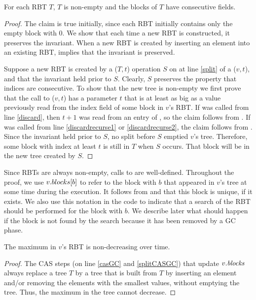 \begin{invariant}\label{nonemptyConsec}
For each RBT $T$, 
$T$ is non-empty and the blocks of $T$ have consecutive  fields.
\end{invariant}
\begin{proof}
The claim is true initially, since each RBT initially contains only the empty block with  0.
We show that each time a new RBT is constructed, it preserves the invariant.
When a new RBT is created by inserting an element into an existing RBT, 
implies that the invariant is preserved.

Suppose a new RBT is created by a ($T,t$) operation $S$ on at line \ref{split} of a ($v,t$), 
and that the invariant held prior to $S$.
Clearly, $S$ preserves the property that indices are consecutive.  To show that the new tree
is non-empty we first prove that the call to ($v,t$) has a parameter $t$ that is at least as big as a value previously
read from the index field of some block in $v$'s RBT.
If  was called from line \ref{discard}, then $t+1$ was read from an entry of , so the claim follows from .
If  was called from line \ref{discardrecurse1} or \ref{discardrecurse2}, the claim follows
from .
Since the invariant held prior to $S$, no split before $S$ emptied $v$'s tree.  Therefore,
some block with index at least $t$ is still in $T$ when $S$ occurs.  That block will be in the new tree created by $S$.
\end{proof}

Since RBTs are always non-empty, calls to  are well-defined.  
Throughout the proof, we use $v.blocks[b]$ to refer to the block with  $b$ that appeared
in $v$'s tree at some time during the execution.
It follows from  and  that this block is unique, if 
it exists.
We also use this notation in the code to indicate that a search of the RBT should be performed for the block
with  $b$.
We describe later what should happen if the block is not found by the search because it has been removed
by a GC phase.

\begin{corollary}\label{maxNonDecreasing}
The maximum  in $v$'s RBT is non-decreasing over time.
\end{corollary}
\begin{proof}
The CAS steps (on line \ref{casGC} and \ref{splitCASGC}) that update $v.\mbox{\textit{blocks}}$ always replace 
a tree $T$ by a tree that is built from $T$ by inserting an element and/or removing the elements with 
the smallest  values, without emptying the tree.  Thus, the maximum  in the tree cannot decrease.
\end{proof}

